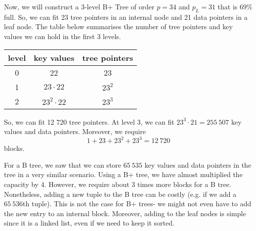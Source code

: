 \documentclass[a4paper, openany]{memoir}
\begin{document}
Now, we will construct a 3-level B+ Tree of order $p = 34$ and $p_L = 31$ that is $69\%$ full. So, we can fit 23 tree pointers in an internal node and 21 data pointers in a leaf node. The table below summarises the number of tree pointers and key values we can hold in the first 3 levels.
\begin{table}[H]
    \centering
    \begin{tabular}{|c|c|c|}
        \hline
        level & key values & tree pointers \\
        \hline
        0 & 22 & 23 \\
        1 & $23 \cdot 22$ & $23^2$ \\
        2 & $23^2 \cdot 22$ & $23^3$ \\
        \hline
    \end{tabular}
\end{table}
\noindent So, we can fit 12 720 tree pointers. At level 3, we can fit $23^3 \cdot 21 = 255 \ 507$ key values and data pointers. Moreover, we require
\[1 + 23 + 23^2 + 23^3 = 12 \ 720\]
blocks.

For a B tree, we saw that we can store $65 \ 535$ key values and data pointers in the tree in a very similar scenario. Using a B+ tree, we have almost multiplied the capacity by 4. However, we require about 3 times more blocks for a B tree. Nonetheless, adding a new tuple to the B tree can be costly (e.g. if we add a $65 \ 536$th tuple). This is not the case for B+ trees- we might not even have to add the new entry to an internal block. Moreover, adding to the leaf nodes is simple since it is a linked list, even if we need to keep it sorted.
\end{document}
